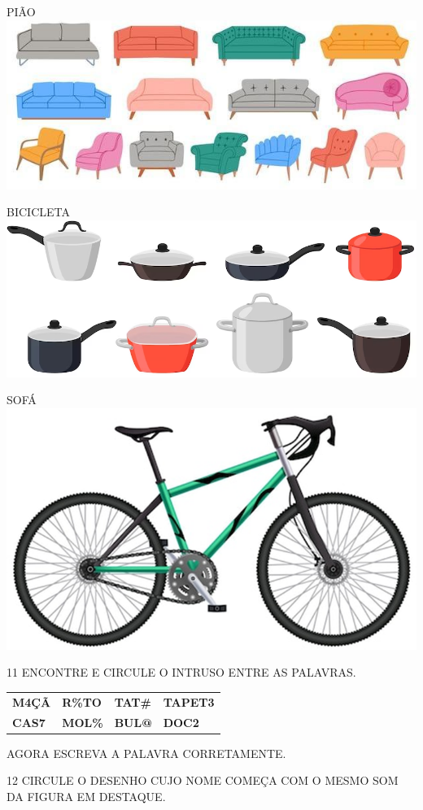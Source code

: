 PIÃO \hfill\includegraphics[width=.4\textwidth]{media/image45.jpg}

BICICLETA \hfill\includegraphics[width=.4\textwidth]{media/image46.png}

SOFÁ \hfill\includegraphics[width=.3\textwidth]{media/image48.png}

\num{11} ENCONTRE E CIRCULE O INTRUSO ENTRE AS PALAVRAS.

\begin{longtable}[]{@{}llll@{}}
\toprule
\textbf{M4ÇÃ} & \textbf{R\%TO} & \textbf{TAT\#} &
\textbf{TAPET3}\tabularnewline
\textbf{CAS7} & \textbf{MOL\%} & \textbf{BUL@} &
\textbf{DOC2}\tabularnewline
\bottomrule
\end{longtable}

AGORA ESCREVA A PALAVRA CORRETAMENTE.


\num{12} CIRCULE O DESENHO CUJO NOME COMEÇA COM O MESMO SOM DA FIGURA EM DESTAQUE.

